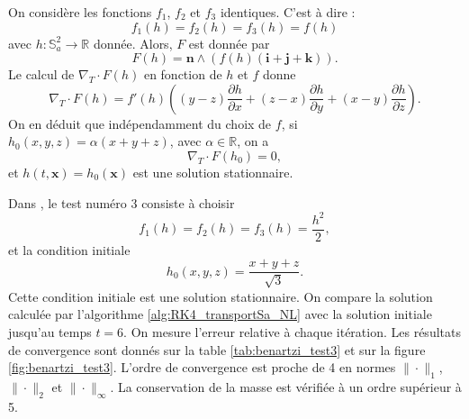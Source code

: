On considère les fonctions $f_1$, $f_2$ et $f_3$ identiques. C'est à dire :
\begin{equation}
f_1(h) = f_2(h) = f_3(h) = f(h)
\end{equation}
avec $h : \mathbb{S}_a^2 \rightarrow \mathbb{R}$ donnée.
Alors, $F$ est donnée par
\begin{equation}
F(h) = \mathbf{n} \wedge \left( f(h) (\mathbf{i}+\mathbf{j}+\mathbf{k}) \right).
\end{equation}
Le calcul de $\nabla_T \cdot F(h)$ en fonction de $h$ et $f$ donne
\begin{equation}
\nabla_T \cdot F(h) = f'(h) \left( (y-z)\dfrac{\partial h}{\partial x} + (z-x)\dfrac{\partial h}{\partial y} + (x-y)\dfrac{\partial h}{\partial z} \right).
\end{equation}
On en déduit que indépendamment du choix de $f$, si $h_0(x,y,z) = \alpha (x+y+z)$, avec $\alpha \in \mathbb{R}$, on a
\begin{equation}
\nabla_T \cdot F(h_0) = 0,
\end{equation}
et $h(t,\mathbf{x}) = h_0(\mathbf{x})$ est une solution stationnaire.

Dans \cite{BenArtzi2009}, le test numéro 3 consiste à choisir
\begin{equation}
f_1(h) = f_2(h) = f_3(h) = \dfrac{h^2}{2},
\end{equation}
et la condition initiale 
\begin{equation}
h_0(x,y,z) = \dfrac{x+y+z}{\sqrt{3}}.
\end{equation}
Cette condition initiale est une solution stationnaire. On compare la solution calculée par l'algorithme \ref{alg:RK4_transportSa_NL} avec la solution initiale jusqu'au temps $t=6$. On mesure l'erreur relative à chaque itération. Les résultats de convergence sont donnés sur la table \ref{tab:benartzi_test3} et sur la figure \ref{fig:benartzi_test3}. L'ordre de convergence est proche de 4 en normes $\| \cdot \|_1$, $\| \cdot \|_2$ et $\| \cdot \|_{\infty}$. La conservation de la masse est vérifiée à un ordre supérieur à 5.

